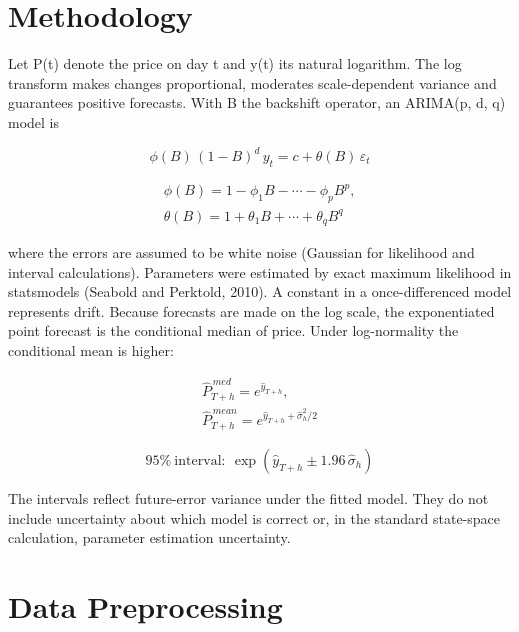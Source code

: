 \documentclass[11pt,a4paper]{article}
\begin{document}
\section{Methodology}

Let P(t) denote the price on day t and y(t) its natural logarithm. The log transform makes changes proportional, moderates scale-dependent variance and guarantees positive forecasts. With B the backshift operator, an ARIMA(p, d, q) model is

\begin{equation}
\phi(B)\,(1-B)^d\,y_t = c + \theta(B)\,\varepsilon_t
\end{equation}

\begin{equation}
\begin{gathered}
\phi(B)=1-\phi_1B-\cdots-\phi_pB^p,\\ \theta(B)=1+\theta_1B+\cdots+\theta_qB^q
\end{gathered}
\end{equation}

where the errors are assumed to be white noise (Gaussian for likelihood and interval calculations). Parameters were estimated by exact maximum likelihood in statsmodels (Seabold and Perktold, 2010). A constant in a once-differenced model represents drift. Because forecasts are made on the log scale, the exponentiated point forecast is the conditional median of price. Under log-normality the conditional mean is higher:

\begin{equation}
\begin{gathered}
\hat P^{\,med}_{T+h}=e^{\hat y_{T+h}},\\ \hat P^{\,mean}_{T+h}=e^{\hat y_{T+h}+\hat\sigma_h^2/2}
\end{gathered}
\end{equation}

\begin{equation}
95\%\ \mathrm{interval}:\ \exp(\hat y_{T+h}\pm 1.96\,\hat\sigma_h)
\end{equation}

The intervals reflect future-error variance under the fitted model. They do not include uncertainty about which model is correct or, in the standard state-space calculation, parameter estimation uncertainty.

\section{Data Preprocessing}
\end{document}
